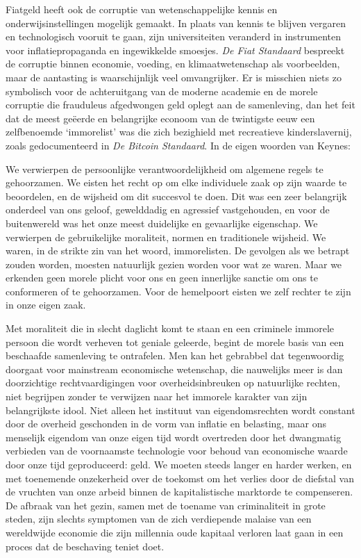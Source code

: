 Fiatgeld heeft ook de corruptie van wetenschappelijke kennis en onderwijsinstellingen mogelijk gemaakt. In plaats van kennis te blijven vergaren en technologisch vooruit te gaan, zijn universiteiten veranderd in instrumenten voor inflatiepropaganda en ingewikkelde smoesjes. \emph{De Fiat Standaard} bespreekt de corruptie binnen economie, voeding, en klimaatwetenschap als voorbeelden, maar de aantasting is waarschijnlijk veel omvangrijker. Er is misschien niets zo symbolisch voor de achteruitgang van de moderne academie en de morele corruptie die frauduleus afgedwongen geld oplegt aan de samenleving, dan het feit dat de meest geëerde en belangrijke econoom van de twintigste eeuw een zelfbenoemde `immorelist' was die zich bezighield met recreatieve kinderslavernij, zoals gedocumenteerd in \emph{De Bitcoin Standaard}. In de eigen woorden van Keynes:

\begin{blockquotebox}
    We verwierpen de persoonlijke verantwoordelijkheid om algemene regels te gehoorzamen. We eisten het recht op om elke individuele zaak op zijn waarde te beoordelen, en de wijsheid om dit succesvol te doen. Dit was een zeer belangrijk onderdeel van ons geloof, gewelddadig en agressief vastgehouden, en voor de buitenwereld was het onze meest duidelijke en gevaarlijke eigenschap. We verwierpen de gebruikelijke moraliteit, normen en traditionele wijsheid. We waren, in de strikte zin van het woord, immorelisten. De gevolgen als we betrapt zouden worden, moesten natuurlijk gezien worden voor wat ze waren. Maar we erkenden geen morele plicht voor ons en geen innerlijke sanctie om ons te conformeren of te gehoorzamen. Voor de hemelpoort eisten we zelf rechter te zijn in onze eigen zaak.\footnotemark
\end{blockquotebox}

Met moraliteit die in slecht daglicht komt te staan en een criminele immorele persoon die wordt verheven tot geniale geleerde, begint de morele basis van een beschaafde samenleving te ontrafelen. Men kan het gebrabbel dat tegenwoordig doorgaat voor mainstream economische wetenschap, die nauwelijks meer is dan doorzichtige rechtvaardigingen voor overheidsinbreuken op natuurlijke rechten, niet begrijpen zonder te verwijzen naar het immorele karakter van zijn belangrijkste idool. Niet alleen het instituut van eigendomsrechten wordt constant door de overheid geschonden in de vorm van inflatie en belasting, maar ons menselijk eigendom van onze eigen tijd wordt overtreden door het dwangmatig verbieden van de voornaamste technologie voor behoud van economische waarde door onze tijd geproduceerd: geld. We moeten steeds langer en harder werken, en met toenemende onzekerheid over de toekomst om het verlies door de diefstal van de vruchten van onze arbeid binnen de kapitalistische marktorde te compenseren. De afbraak van het gezin, samen met de toename van criminaliteit in grote steden, zijn slechts symptomen van de zich verdiepende malaise van een wereldwijde economie die zijn millennia oude kapitaal verloren laat gaan in een proces dat de beschaving teniet doet.

